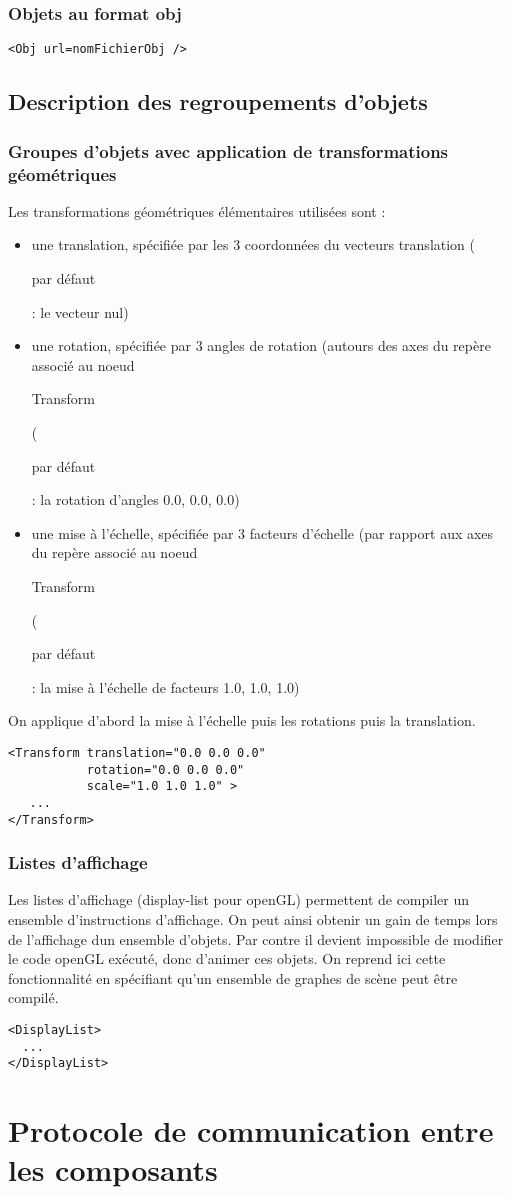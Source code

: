 \documentclass{article}
\begin{document}
\subsubsection{Objets au format obj}
\begin{verbatim}
<Obj url=nomFichierObj />
\end{verbatim}

\subsection{Description des regroupements d'objets}

\subsubsection{Groupes d'objets avec application de transformations géométriques}
Les transformations géométriques élémentaires utilisées sont : 
\begin{itemize}
\item une translation, spécifiée par les 3 coordonnées du vecteurs translation (\begin{bf}par défaut\end{bf} : le vecteur nul)
\item une rotation, spécifiée par 3 angles de rotation (autours des axes du repère 
associé au noeud \begin{tt}Transform\end{tt} (\begin{bf}par défaut\end{bf} : la rotation d'angles 0.0, 0.0, 0.0)
\item une mise à l'échelle, spécifiée par 3 facteurs d'échelle (par rapport aux axes du repère 
associé au noeud \begin{tt}Transform\end{tt} (\begin{bf}par défaut\end{bf} : la mise à l'échelle de facteurs  1.0, 1.0, 1.0)
\end{itemize}
On applique d'abord la mise à l'échelle puis les rotations puis la translation.
\begin{verbatim}
<Transform translation="0.0 0.0 0.0" 
           rotation="0.0 0.0 0.0"
           scale="1.0 1.0 1.0" >
   ...
</Transform>
\end{verbatim}

     
\subsubsection{Listes d'affichage}
Les listes d'affichage (display-list pour openGL) permettent de compiler un ensemble d'instructions
d'affichage. On peut ainsi obtenir un gain de temps lors de l'affichage dun ensemble d'objets. Par
 contre il devient impossible de modifier le code openGL exécuté, donc d'animer ces objets. On
reprend ici cette fonctionnalité en spécifiant qu'un ensemble de graphes de scène peut être compilé.

\begin{verbatim}
<DisplayList>
  ...
</DisplayList>
\end{verbatim}

\section{Protocole de communication entre les composants}
\end{document}
